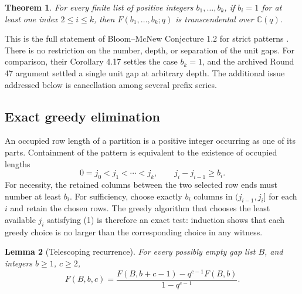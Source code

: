 \documentclass[11pt,a4paper]{article}
\numberwithin{equation}{section}
\newtheorem{theorem}{Theorem}[section]
\newtheorem{lemma}[theorem]{Lemma}
\theoremstyle{definition}
\theoremstyle{remark}
\begin{document}
\begin{theorem}\label{add47taisho:r47:main}
For every finite list of positive integers $b_1,\ldots,b_k$, if
$b_i=1$ for at least one index $2\le i\le k$, then
$F(b_1,\ldots,b_k;q)$ is transcendental over $\mathbb C(q)$.
\end{theorem}

This is the full statement of Bloom--McNew Conjecture 1.2 for strict
patterns \cite{add47taisho:r47:BM}.  There is no restriction on the number, depth,
or separation of the unit gaps.  For comparison, their Corollary 4.17
settles the case $b_k=1$, and the archived Round 47 argument settled a
single unit gap at arbitrary depth.  The additional issue addressed
below is cancellation among several prefix series.

\subsection{Exact greedy elimination}
An occupied row length of a partition is a positive integer occurring
as one of its parts.  Containment of the pattern is equivalent to the
existence of occupied lengths
\[
 0=j_0<j_1<\cdots<j_k,
 \qquad j_i-j_{i-1}\ge b_i.                         \tag{1}
\]
For necessity, the retained columns between the two selected row ends
must number at least $b_i$.  For sufficiency, choose exactly $b_i$
columns in $(j_{i-1},j_i]$ for each $i$ and retain the chosen rows.
The greedy algorithm that chooses the least available $j_i$ satisfying
(1) is therefore an exact test: induction shows that each greedy
choice is no larger than the corresponding choice in any witness.

\begin{lemma}[Telescoping recurrence]\label{add47taisho:r47:rec}
For every possibly empty gap list $B$, and integers $b\ge1$, $c\ge2$,
\[
 F(B,b,c)=
 \frac{F(B,b+c-1)-q^{c-1}F(B,b)}{1-q^{c-1}}.        \tag{2}
\]
\end{lemma}
\end{document}
